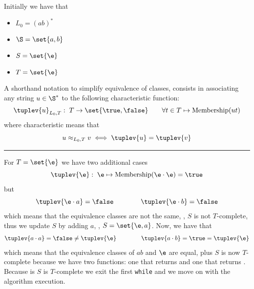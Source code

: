 \documentclass[oneside]{academica}
\begin{document}
\begin{example*}
  Initially we have that
  \begin{center}
    \begin{minipage}[t]{0.4\textwidth}
      \begin{itemize}
        \item[] $L_0 = (ab)^*$
        \item[] $\S = \set{a,b}$
      \end{itemize}
    \end{minipage}
    \begin{minipage}[t]{0.4\textwidth}
      \begin{itemize}
        \item[] $S = \set{\e}$
        \item[] $T = \set{\e}$
      \end{itemize}
    \end{minipage}
  \end{center}

  \bigskip
  A shorthand notation to simplify equivalence of classes, consists in associating any string $u \in \S^*$ to the following characteristic function:
  \begin{equation*}
    \tuplev{u}_{L_0,T}:\; T \to \set{\true,\false} \qquad \forall t \in T \mapsto \text{Membership}(ut)
  \end{equation*}
  where characteristic means that
  \begin{equation*}
    u \approx_{L_0,T} v \iff \tuplev{u} = \tuplev{v}
  \end{equation*}

  \vspace{-15pt}
  \textcolor{orange!140}{\rule{\textwidth}{1.5pt}}
  For $T = \set{\e}$ we have two additional cases
  \begin{equation*}
    \tuplev{\e}:\; \e \mapsto \text{Membership}(\e \cdot \e) = \true
  \end{equation*}
  but
  \begin{equation*}
    \tuplev{\e \cdot a} = \false \qquad \qquad \tuplev{\e \cdot b} = \false
  \end{equation*}
  which means that the equivalence classes are not the same, \ie, $S$ is not $T$-complete, thus we update $S$ by adding $a$, \ie, $S = \set{\e,a}$.
  Now, we have that 
  \begin{equation*}
    \tuplev{a \cdot a} = \false \neq \tuplev{\e} \qquad \qquad \tuplev{a \cdot b} = \true = \tuplev{\e}
  \end{equation*}
  which means that the equivalence classes of $ab$ and $\e$ are equal, plus $S$ is now $T$-complete because we have two functions: one that returns \true and one that returns \false.
  Because is $S$ is $T$-complete we exit the first \texttt{while} and we move on with the algorithm execution.


\end{example*}
\end{document}

